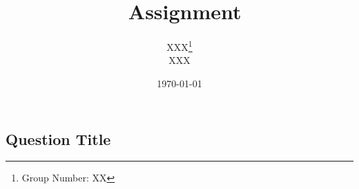 \documentclass{article}
\title{\vspace{-3em}\course\, Assignment \asnum}
\author{XXX\footnote{Group Number: XX}\vspace{1em}\\ XXX}
\date{\today\vspace{-1em}}
\begin{document}
\maketitle
\renewcommand{\arraystretch}{0.6}
\begin{spacing}{2}
    \subsection{Question Title}

\end{spacing}
\end{document}
